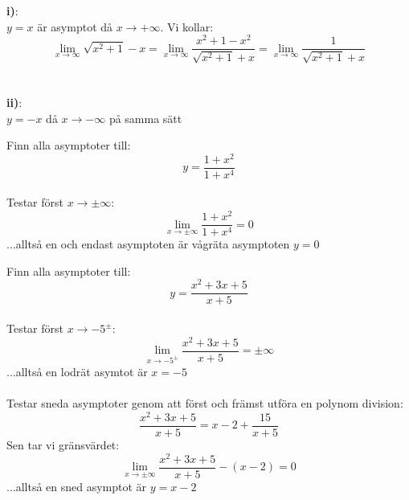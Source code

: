 \documentclass{report}
\begin{document}
{
\textbf{i)}:\\
	$ y = x $ är asymptot då $ x \to + \infty $. Vi kollar:
\begin{equation*}
\lim_{x \to \infty} \sqrt{x^2+1} - x = \lim_{x \to \infty} \frac{x^2+1-x^2}{ \sqrt{x^2+1} +x} = \lim_{x \to \infty} \frac{1}{ \sqrt{x^2+1} +x} 
\end{equation*}
\\\\
\textbf{ii)}:\\
$ y = -x $ då $ x \to - \infty $ på samma sätt
}

\vspace{20pt}
\qs{}
{
Finn alla asymptoter till:
\begin{equation*}
y = \frac{1+x^2}{1+x^4} 
\end{equation*}
}
\sol\\
Testar först $ x \to \pm \infty $:
\begin{equation*}
\lim_{x \to \pm \infty} \frac{1+x^2}{1+x^4} = 0
\end{equation*}
...alltså en och endast asymptoten är vågräta asymptoten $ y = 0 $

\pagebreak
\qs{}
{
Finn alla asymptoter till:
\begin{equation*}
y = \frac{x^2+3x+5}{x+5} 
\end{equation*}
}
\sol\\
Testar först $ x \to -5^{\pm} $:
\begin{equation*}
	\lim_{x \to -5^{\pm}} \frac{x^2+3x+5}{x+5} = \pm \infty 
\end{equation*}
...alltså en lodrät asymtot är $ x = -5 $\\\\

\noindent
Testar sneda asymptoter genom att först och främst utföra en polynom division:
\begin{equation*}
\frac{x^2+3x+5}{x+5} = x-2 + \frac{15}{x+5} 
\end{equation*}
Sen tar vi gränsvärdet:
\begin{equation*}
\lim_{x \to \pm \infty} \frac{x^2+3x+5}{x+5} -(x-2) = 0 
\end{equation*}
...alltså en sned asymptot är $ y = x-2 $  
\end{document}
